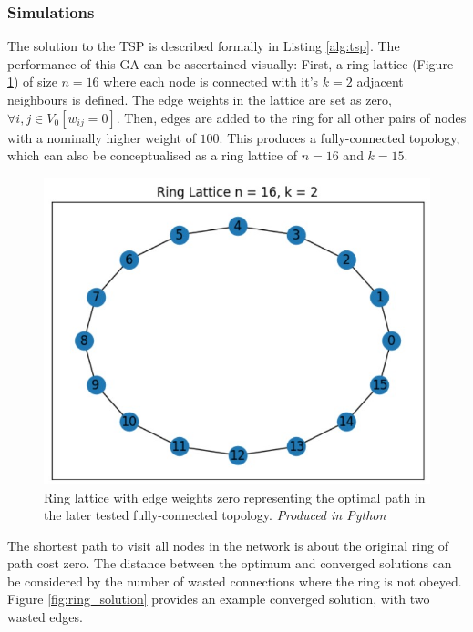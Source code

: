 \documentclass[
	a4paper, %
	10pt, %
	unnumberedsections, %
	twoside, %
]{LTJournalArticle}
\begin{document}
\subsubsection{Simulations} 

The solution to the TSP is described formally in Listing \ref{alg:tsp}. The performance of this GA can be ascertained visually: First, a ring lattice (Figure \ref{fig:ring_optimal}) of size \(n = 16\) where each node is connected with it's \(k = 2\) adjacent neighbours is defined. The edge weights in the lattice are set as zero, \(\forall i, j \in V_{0} [w_{ij} = 0]\). Then, edges are added to the ring for all other pairs of nodes with a nominally higher weight of \(100\). This produces a fully-connected topology, which can also be conceptualised as a ring lattice of \(n = 16\) and \(k = 15\). \\

\begin{figure}[H]
	\includegraphics[width=\linewidth]{Figures/tsp/ring_optimal.jpg}
	\caption{Ring lattice with edge weights zero representing the optimal path in the later tested fully-connected topology. \emph{Produced in Python}}
	\label{fig:ring_optimal}
\end{figure}

The shortest path to visit all nodes in the network is about the original ring of path cost zero. The distance between the optimum and converged solutions can be considered by the number of wasted connections where the ring is not obeyed. Figure \ref{fig:ring_solution} provides an example converged solution, with two wasted edges. 
\end{document}
